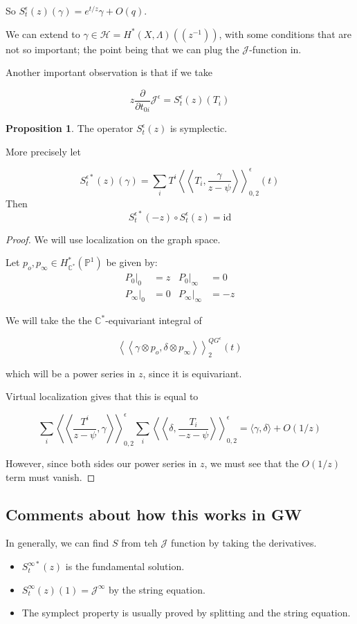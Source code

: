\documentclass{amsart}
\theoremstyle{definition}
\newtheorem{proposition}[dummy]{Proposition}
\newcommand{\proj}{\mathbb{P}}
\newcommand{\J}{\mathcal{J}}
\newcommand{\C}{\mathbb{C}}
\newcommand{\one}{1}
\begin{document}
So $S_t^\epsilon(z)(\gamma)=e^{t/z}\gamma+O(q)$.

We can extend to $\gamma\in\mathcal{H}=H^*(X,\Lambda)((z^{-1}))$, with some conditions that are not so important; the point being that we can plug the $\J$-function in.

Another important observation is that if we take

$$z\frac{\partial}{\partial t_{0i}} \J^\epsilon=S^\epsilon_t(z)(T_i)$$

\begin{proposition}
The operator $S_t^\epsilon(z)$  is symplectic.  

More precisely let 

$$S_t^{\epsilon*}(z)(\gamma)=\sum_{i}T^i\left\langle\left\langle T_i,\frac{\gamma}{z-\psi}\right\rangle\right\rangle^\epsilon_{0,2}(t)$$
Then
$$S_t^{\epsilon*}(-z)\circ S_t^\epsilon(z)=\text{id}$$
\end{proposition}
\begin{proof}
We will use localization on the graph space.

Let $p_o,p_\infty\in H^*_{\C^*}(\proj^1)$ be given by:
\begin{align*}
P_0|_0&=z & P_0|_\infty&=0 \\
P_\infty|_0&=0 & P_\infty|_\infty&=-z 
\end{align*}

We will take the the $\C^*$-equivariant integral of

$$\left\langle\left\langle \gamma\otimes p_o,\delta\otimes p_\infty\right\rangle\right\rangle^{QG^\epsilon}_2(t)$$

which will be a power series in $z$, since it is equivariant.  

Virtual localization gives that this is equal to 

$$\sum_{i}\left\langle\left\langle\frac{T^i}{z-\psi},\gamma\right\rangle\right\rangle^\epsilon_{0,2}
\sum_{i}\left\langle\left\langle\delta, \frac{T_i}{-z-\psi}\right\rangle\right\rangle^\epsilon_{0,2}=\langle \gamma,\delta\rangle+O(1/z)$$

However, since both sides our power series in $z$, we must see that the $O(1/z)$ term must vanish.
\end{proof}

\subsection{Comments about how this works in GW}
In generally, we can find $S$ from teh $\J$ function by taking the derivatives.
\begin{itemize}
\item $S^{\infty*}_t(z)$ is the fundamental solution.
\item $S^\infty_t(z)(\one)=\J^\infty$ by the string equation.
\item The symplect property is usually proved by splitting and the string equation.
\end{itemize}
\end{document}

